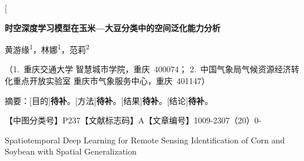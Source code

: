 \documentclass[a4paper, zihao=5, twocolumn]{ctexart}
\begin{document}
\twocolumn[
\begin{@twocolumnfalse}
\begingroup
\setlength{\parindent}{0pt}

{
\centering

{\songti \bfseries {} 时空深度学习模型在玉米—大豆分类中的空间泛化能力分析\par}

\vspace{1em}

{\fangsong {} 黄游缘\textsuperscript{1}，林\hspace{0.5em}娜\textsuperscript{1}，范\hspace{0.5em}莉\textsuperscript{2}\par}

\vspace{0.5em}

{\kaishu {}%
（1.~重庆交通大学 智慧城市学院，重庆~400074；
2.~中国气象局气候资源经济转化重点开放实验室 重庆市气象服务中心，重庆~401147）\par}

\vspace{1em}
}

{\heiti {}
\noindent 摘要：[目的]\textbf{待补}。[方法]\textbf{待补}。[结果]\textbf{待补}。[结论]\textbf{待补}。\par}

\vspace{0.3em}

{
\par}

\vspace{0.3em}

{ \songti
\noindent 【中图分类号】P237\hspace{2em}【文献标志码】A\hspace{2em}【文章编号】1009-2307（20\hspace{0.5em}）0\hspace{0.3em}-\par}

\vspace{1.5em}

{\centering \rmfamily {} Spatiotemporal Deep Learning for Remote Sensing Identification of Corn and Soybean with Spatial Generalization\par}


\end{@twocolumnfalse}
\end{document}
